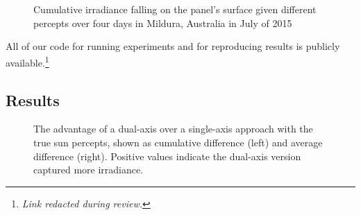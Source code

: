\documentclass{article}
\begin{document}
{%
\begin{figure*}[!t]
\begin{center}
	 \hspace{1mm}%
	 \hspace{1mm} %
	 \\ %
	 \hspace{1mm} %
	 \hspace{1mm} %
	 \\ %
\caption{Cumulative irradiance falling on the panel's surface given different percepts over four days in Mildura, Australia in July of 2015}%
\label{fig:results}
\end{center}
\end{figure*}


All of our code for running experiments and for reproducing results is publicly available.\footnote{{\it Link redacted during review.}} %

\subsection{Results}


\begin{figure}[!b]
\begin{center}
\caption{The advantage of a dual-axis over a single-axis approach with the true sun percepts, shown as cumulative difference (left) and average difference (right). Positive values indicate the dual-axis version captured more irradiance.}
\label{fig:results_axis}
\end{center}
\end{figure}


}
\end{document}
